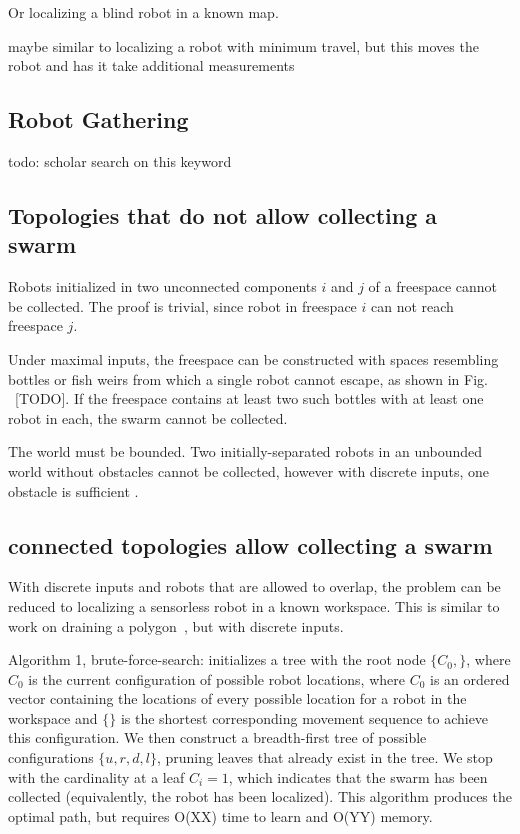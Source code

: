 \documentclass[letterpaper, 10 pt, conference]{ieeeconf}
\begin{document}
  Or localizing a blind robot in a known map.

  maybe similar to localizing a robot with minimum travel, but this moves the robot and has it take additional measurements\cite{dudek1998localizing}  %
  
  
    \subsection{Robot Gathering}
todo: scholar search on this keyword

  
  \subsection{Topologies that do not allow collecting a swarm}
  Robots initialized in two unconnected components $i$ and $j$ of a freespace cannot be collected.  The proof is trivial, since robot in freespace $i$ can not reach freespace $j$.
  
  Under maximal inputs, the freespace can be constructed with spaces resembling bottles or fish weirs from which a single robot cannot escape, as shown in Fig. ~[TODO].  If the freespace contains at least two such bottles with at least one robot in each, the swarm cannot be collected.
  
The world must be bounded.  Two initially-separated robots in an unbounded world without obstacles cannot be collected, however with discrete inputs, one obstacle is sufficient \cite{Becker2013b}.

  \subsection{ connected  topologies allow collecting a swarm}
  With discrete inputs and robots that are allowed to overlap, the problem can be reduced to localizing a sensorless robot in a known workspace.   This is similar to work on draining a polygon~\cite{aloupis2014draining}, but with discrete inputs.  
  
  Algorithm 1, brute-force-search:
initializes a tree with the root node $\{ C_0, {} \}$, where $C_0$ is the current configuration  of possible robot locations, where $C_0$ is an ordered vector containing the locations of every possible location for a robot in the workspace and $\{\}$ is the shortest corresponding movement sequence to achieve this configuration.
We then construct a breadth-first tree of possible configurations $\{ u,r,d,l\}$,   pruning leaves that already exist in the tree. We stop with  the cardinality at a leaf $C_i = 1$, which indicates that the swarm has been collected (equivalently, the robot has been localized).
This algorithm produces the optimal path, but requires O(XX) time to learn and O(YY) memory.
\end{document}
